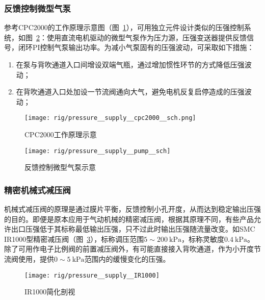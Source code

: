 \subsubsection{反馈控制微型气泵}\label{sec:rig-pressure-supply-pump}

参考CPC2000的工作原理示意图（图~\ref{fig:rig-pressure-supply-cpc2000-sch}），可用独立元件设计类似的压强控制系统，如图~\ref{fig:rig-pressure-supply-pump-sch}：使用直流电机驱动的微型气泵作为压力源，压强变送器提供反馈信号，闭环PI控制气泵输出功率。为减小气泵固有的压强波动，可采取如下措施：

\begin{enumerate}
  \item 在泵与背吹通道入口间增设双端气瓶，通过增加惯性环节的方式降低压强波动；
  \item 在背吹通道入口处加设一节流阀通向大气，避免电机反复启停造成的压强波动；
\end{enumerate}

\begin{figure}[tbh]
\centering
\texttt{[image: rig/pressure\_\_supply\_\_cpc2000\_\_sch.png]}
\caption{CPC2000工作原理示意}
\label{fig:rig-pressure-supply-cpc2000-sch}
\end{figure}

\begin{figure}[tbh]
\centering
\texttt{[image: rig/pressure\_\_supply\_\_pump\_\_sch]}
\caption{反馈控制微型气泵示意}
\label{fig:rig-pressure-supply-pump-sch}
\end{figure}

\subsubsection{精密机械式减压阀}\label{sec:rig-pressure-supply-reg}

机械式减压阀的原理是通过膜片平衡，反馈控制小孔开度，从而达到稳定输出压强的目的。即便是原本应用于气动机械的精密减压阀，根据其原理不同，有些产品允许出口压强低于其标称最低输出压强，只不过此时输出压强随流量改变。如SMC IR1000型精密减压阀（图~\ref{fig:rig-pressure-supply-ir1000}），标称调压范围$\num{5} \sim \SI{200}{\kilo\pascal}$，标称灵敏度$\SI{0.4}{\kilo\pascal}$。除了可用作电子比例阀的前置减压阀外，有可能直接接入背吹通道，作为小开度节流阀使用，提供$\num{0} \sim \SI{5}{\kilo\pascal}$范围内的缓慢变化的压强。

\begin{figure}[tbh]
\centering
\texttt{[image: rig/pressure\_\_supply\_\_IR1000]}
\caption{IR1000简化剖视}
\label{fig:rig-pressure-supply-ir1000}
\end{figure}


